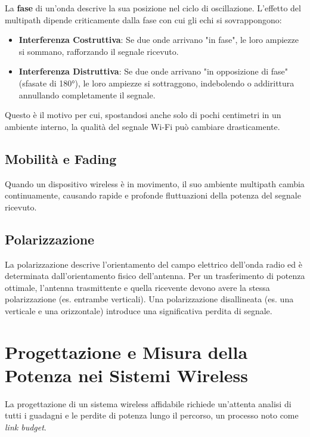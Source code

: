 
La \textbf{fase} di un'onda descrive la sua posizione nel ciclo di oscillazione. L'effetto del multipath dipende criticamente dalla fase con cui gli echi si sovrappongono:
\begin{itemize}
    \item \textbf{Interferenza Costruttiva}: Se due onde arrivano "in fase", le loro ampiezze si sommano, rafforzando il segnale ricevuto.
    \item \textbf{Interferenza Distruttiva}: Se due onde arrivano "in opposizione di fase" (sfasate di 180°), le loro ampiezze si sottraggono, indebolendo o addirittura annullando completamente il segnale.
\end{itemize}

Questo è il motivo per cui, spostandosi anche solo di pochi centimetri in un ambiente interno, la qualità del segnale Wi-Fi può cambiare drasticamente.

\subsection{Mobilità e Fading}
Quando un dispositivo wireless è in movimento, il suo ambiente multipath cambia continuamente, causando rapide e profonde fluttuazioni della potenza del segnale ricevuto.


\subsection{Polarizzazione}
La polarizzazione descrive l'orientamento del campo elettrico dell'onda radio ed è determinata dall'orientamento fisico dell'antenna. Per un trasferimento di potenza ottimale, l'antenna trasmittente e quella ricevente devono avere la stessa polarizzazione (es. entrambe verticali). Una polarizzazione disallineata (es. una verticale e una orizzontale) introduce una significativa perdita di segnale.

\section{Progettazione e Misura della Potenza nei Sistemi Wireless}
La progettazione di un sistema wireless affidabile richiede un'attenta analisi di tutti i guadagni e le perdite di potenza lungo il percorso, un processo noto come \textit{link budget}.

